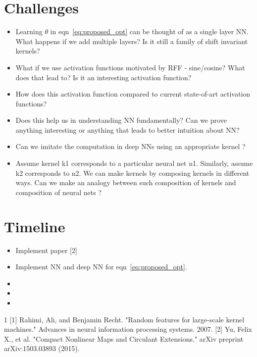 \documentclass[]{article}
\begin{document}
\section{Challenges}
\begin{itemize}
\item Learning $\theta $ in eqn~\ref{eq:proposed_opt} can be thought of as a single layer NN. What happens if we add multiple layers? Is it still a family of shift invariant kernels?
\item What if we use activation functions motivated by RFF - sine/cosine? What does that lead to? Is it an interesting activation function?
\item How does this activation function compared to current state-of-art activation functions? 
\item Does this help us in understanding NN fundamentally? Can we prove anything interesting or anything that leads to better intuition about NN?
\item Can we imitate the computation in deep NNs using an appropriate kernel ?
\item Assume kernel k1 corresponds to a particular neural net n1. Similarly, assume k2 corresponds to n2. We can make kernels by composing kernels in different ways. Can we make an analogy between such composition of kernels and composition of neural nets ?

\end{itemize}


\section{Timeline}
\begin{itemize}
\item Implement paper [2]
\item Implement NN and deep NN for eqn~\ref{eq:proposed_opt}. 
\item 
\item
\item
\end{itemize}



\begin{thebibliography}{1}
[1] Rahimi, Ali, and Benjamin Recht. "Random features for large-scale kernel machines." Advances in neural information processing systems. 2007. 
[2] Yu, Felix X., et al. "Compact Nonlinear Maps and Circulant Extensions." arXiv preprint arXiv:1503.03893 (2015).

\end{thebibliography}
\end{document}
